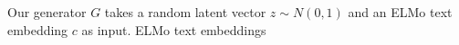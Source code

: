 Our generator $G$ takes a random latent vector $z \sim N(0, 1)$ and an ELMo text embedding $c$ as input. ELMo text embeddings 
